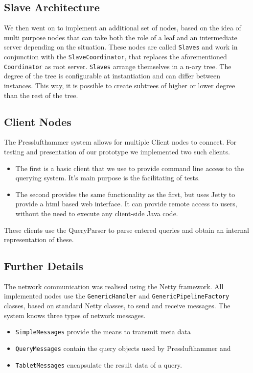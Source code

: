     
  \subsection{Slave Architecture}
    We then went on to implement an additional set of nodes, based on the
    idea of multi purpose nodes that can take both the role of a leaf
    and an intermediate server depending on the situation.
    These nodes are called \texttt{Slaves} and work in conjunction with the
    \texttt{SlaveCoordinator}, that replaces the aforementioned 
    \texttt{Coordinator} as root server.
    \texttt{Slaves} arrange themselves in a n-ary tree.
    The degree of the tree is configurable at instantiation
    and can differ between instances.
    This way, it is possible to create subtrees of higher or lower degree
    than the rest of the tree.


  \subsection{Client Nodes}
    The Presslufthammer system allows for multiple Client nodes to connect.
    For testing and presentation of our prototype we implemented two such
    clients.
    \begin{itemize}
      \item The first is a basic client that we use to provide command
            line access to the querying system.
            It's main purpose is the facilitating of tests.
      \item The second provides the same functionality as the first,
            but uses Jetty \cite{jetty} to provide a html based web
            interface.
            It can provide remote access to users, without the need
            to execute any client-side Java code.
    \end{itemize}
    These clients use the QueryParser to parse entered queries and obtain
    an internal representation of these.


  \subsection{Further Details}
    The network communication was realised using the Netty framework.
    All implemented nodes use the \texttt{GenericHandler} and
    \texttt{GenericPipelineFactory} classes, based on standard Netty classes,
    to send and receive messages.
    The system knows three types of network messages.
    \begin{itemize}
      \item \texttt{SimpleMessages} provide the means to transmit meta data
      \item \texttt{QueryMessages} contain the query objects used by
        Presslufthammer and
      \item \texttt{TabletMessages} encapsulate the result data of a query.
    \end{itemize}



